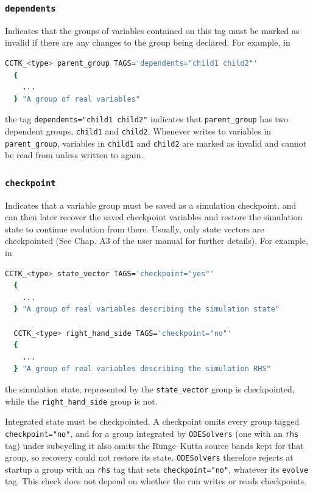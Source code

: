 \subsubsection{\texttt{dependents}}

Indicates that the groups of variables contained on this tag must be marked as invalid if there are any changes to the group being declared. For example, in
%
\begin{lstlisting}[language=bash]
  CCTK_<type> parent_group TAGS='dependents="child1 child2"'
  {
    ...
  } "A group of real variables"
\end{lstlisting}
%
the tag \texttt{dependents="child1 child2"} indicates that \texttt{parent\_group} has two dependent groups, \texttt{child1} and \texttt{child2}. Whenever \CarpetX\space writes to variables in \texttt{parent\_group}, variables in \texttt{child1} and \texttt{child2} are marked as invalid and cannot be read from unless written to again.

\subsubsection{\texttt{checkpoint}}

Indicates that a variable group must be saved as a simulation checkpoint. \Cactus\space and \CarpetX\space can then later recover the saved checkpoint variables and restore the simulation state to continue evolution from there. Usually, only state vectors are checkpointed (See Chap. A3 of the \Cactus user manual for further details). For example, in
%
\begin{lstlisting}[language=bash]
  CCTK_<type> state_vector TAGS='checkpoint="yes"'
  {
    ...
  } "A group of real variables describing the simulation state"

  CCTK_<type> right_hand_side TAGS='checkpoint="no"'
  {
    ...
  } "A group of real variables describing the simulation RHS"
\end{lstlisting}
%
the simulation state, represented by the \texttt{state\_vector} group is checkpointed, while the \texttt{right\_hand\_side} group is not.

Integrated state must be checkpointed. A checkpoint omits every group tagged \texttt{checkpoint="no"}, and for a group integrated by \texttt{ODESolvers} (one with an \texttt{rhs} tag) under subcycling it also omits the Runge--Kutta source bands kept for that group, so recovery could not restore its state. \texttt{ODESolvers} therefore rejects at startup a group with an \texttt{rhs} tag that sets \texttt{checkpoint="no"}, whatever its \texttt{evolve} tag. This check does not depend on whether the run writes or reads checkpoints.

